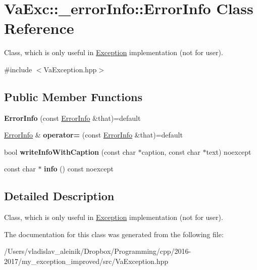 \hypertarget{class_va_exc_1_1__error_info_1_1_error_info}{}\section{Va\+Exc\+:\+:\+\_\+error\+Info\+:\+:Error\+Info Class Reference}
\label{class_va_exc_1_1__error_info_1_1_error_info}


Class, which is only useful in \hyperlink{class_va_exc_1_1_exception}{Exception} implementation (not for user).  




{\ttfamily \#include $<$Va\+Exception.\+hpp$>$}

\subsection*{Public Member Functions}
\begin{DoxyCompactItemize}
\item 
\mbox{\label{class_va_exc_1_1__error_info_1_1_error_info_a8e70c2267c061daddc8778d16fd81ec2}} 
{\bfseries Error\+Info} (const \hyperlink{class_va_exc_1_1__error_info_1_1_error_info}{Error\+Info} \&that)=default
\item 
\mbox{\label{class_va_exc_1_1__error_info_1_1_error_info_a00a0be51a306cd94860f3b106f8ec84d}} 
\hyperlink{class_va_exc_1_1__error_info_1_1_error_info}{Error\+Info} \& {\bfseries operator=} (const \hyperlink{class_va_exc_1_1__error_info_1_1_error_info}{Error\+Info} \&that)=default
\item 
\mbox{\label{class_va_exc_1_1__error_info_1_1_error_info_a5dcada9ad51894ce7ba3c1529d25707d}} 
bool {\bfseries write\+Info\+With\+Caption} (const char $\ast$caption, const char $\ast$text) noexcept
\item 
\mbox{\label{class_va_exc_1_1__error_info_1_1_error_info_abb528f3a7b6274b5676d2bd9b2476b7a}} 
const char $\ast$ {\bfseries info} () const noexcept
\end{DoxyCompactItemize}


\subsection{Detailed Description}
Class, which is only useful in \hyperlink{class_va_exc_1_1_exception}{Exception} implementation (not for user). 

The documentation for this class was generated from the following file\+:\begin{DoxyCompactItemize}
\item 
/\+Users/vladislav\+\_\+aleinik/\+Dropbox/\+Programming/cpp/2016-\/2017/my\+\_\+exception\+\_\+improved/src/Va\+Exception.\+hpp\end{DoxyCompactItemize}
